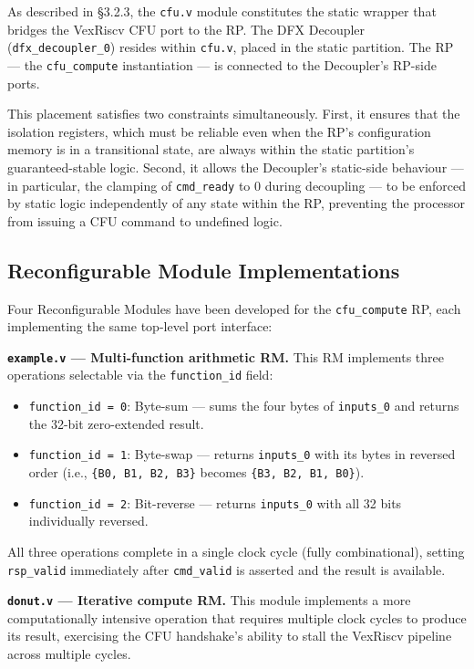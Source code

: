 As described in §3.2.3, the \texttt{cfu.v} module constitutes the static wrapper that bridges the VexRiscv CFU port to the RP. The DFX Decoupler (\texttt{dfx\_decoupler\_0}) resides within \texttt{cfu.v}, placed in the static partition. The RP — the \texttt{cfu\_compute} instantiation — is connected to the Decoupler's RP-side ports.

This placement satisfies two constraints simultaneously. First, it ensures that the isolation registers, which must be reliable even when the RP's configuration memory is in a transitional state, are always within the static partition's guaranteed-stable logic. Second, it allows the Decoupler's static-side behaviour — in particular, the clamping of \texttt{cmd\_ready} to 0 during decoupling — to be enforced by static logic independently of any state within the RP, preventing the processor from issuing a CFU command to undefined logic.

\subsection{Reconfigurable Module Implementations}

Four Reconfigurable Modules have been developed for the \texttt{cfu\_compute} RP, each implementing the same top-level port interface:

\textbf{\texttt{example.v} — Multi-function arithmetic RM.} This RM implements three operations selectable via the \texttt{function\_id} field:

\begin{itemize}
  \item \texttt{function\_id = 0}: Byte-sum — sums the four bytes of \texttt{inputs\_0} and returns the 32-bit zero-extended result.
  \item \texttt{function\_id = 1}: Byte-swap — returns \texttt{inputs\_0} with its bytes in reversed order (i.e., \texttt{\{B0, B1, B2, B3\}} becomes \texttt{\{B3, B2, B1, B0\}}).
  \item \texttt{function\_id = 2}: Bit-reverse — returns \texttt{inputs\_0} with all 32 bits individually reversed.
\end{itemize}
All three operations complete in a single clock cycle (fully combinational), setting \texttt{rsp\_valid} immediately after \texttt{cmd\_valid} is asserted and the result is available.

\textbf{\texttt{donut.v} — Iterative compute RM.} This module implements a more computationally intensive operation that requires multiple clock cycles to produce its result, exercising the CFU handshake's ability to stall the VexRiscv pipeline across multiple cycles.

